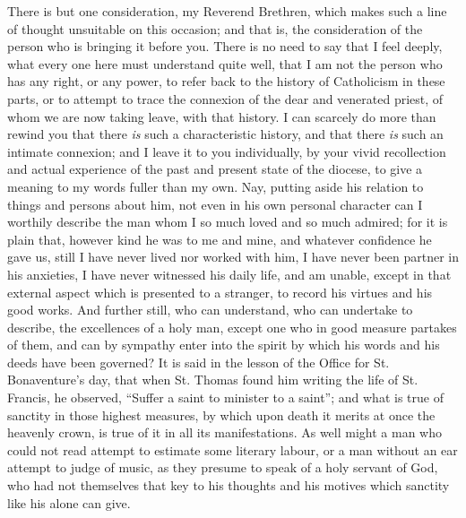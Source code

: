 There is but one consideration, my Reverend Brethren, which makes such a line of thought unsuitable on this
occasion; and that is, the consideration of the person
who is bringing it before you. There is no need to say
that I feel deeply, what every one here must understand
quite well, that I am not the person who has any right,
or any power, to refer back to the history of Catholicism
in these parts, or to attempt to trace the connexion of
the dear and venerated priest, of whom we are now taking
leave, with that history. I can scarcely do more than
rewind you that there \emph{is} such a characteristic
history, and that there \emph{is} such an intimate
connexion; and I leave it to you individually, by your
vivid recollection and actual experience of the past and
present state of the diocese, to give a meaning to my
words fuller than my own. Nay, putting aside his relation
to things and persons about him, not even in his own
personal character can I worthily describe the man whom I
so much loved and so much admired; for it is plain that,
however kind he was to me and mine, and whatever
confidence he gave us, still I have never lived nor
worked with him, I have never been partner in his
anxieties, I have never witnessed his daily life, and am
unable, except in that external aspect which is presented
to a stranger, to record his virtues and his good works.
And further still, who can understand, who can undertake
to describe, the excellences of a holy man, except one
who in good measure partakes of them, and can by sympathy
enter into the spirit by which his words and his deeds
have been governed? It is said in the lesson of the
Office for St. Bonaventure's day, that when St. Thomas
found him writing the life of St. Francis, he observed,
``Suffer a saint to minister to a saint''; and
what is true of sanctity in those highest measures, by
which upon death it merits at once the heavenly crown, is
true of it in all its manifestations. As well might a man
who could not read attempt to estimate some literary
labour, or a man without an ear attempt to judge of
music, as they presume to speak of a holy servant of God,
who had not themselves that key to his thoughts and his
motives which sanctity like his alone can give.

